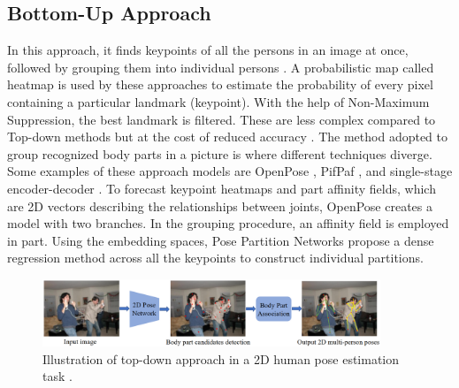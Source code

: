 \subsection{Bottom-Up Approach}
In this approach, it finds keypoints of all the persons in an image at once, followed by grouping them into individual persons \cite{bottom-up}. A probabilistic map called heatmap is used by these approaches to estimate the probability of every pixel containing a particular landmark (keypoint). With the help of Non-Maximum Suppression, the best landmark is filtered. These are less complex compared to Top-down methods but at the cost of reduced accuracy \cite{YOLO-Pose}. The method adopted to group recognized body parts in a picture is where different techniques diverge. Some examples of these approach models are OpenPose \cite{Openpose}, PifPaf \cite{PifPaf}, and single-stage encoder-decoder \cite{Nimbro}. To forecast keypoint heatmaps and part affinity fields, which are 2D vectors describing the relationships between joints, OpenPose \cite{Openpose} creates a model with two branches. In the grouping procedure, an affinity field is employed in part. Using the embedding spaces, Pose Partition Networks \cite{PosePartitionNetwork} propose a dense regression method across all the keypoints to construct individual partitions.

\begin{figure}[h!]
    \centering
    \includegraphics[width=0.9\textwidth]{bab2/ar_BottomUp.png}
    \caption{Illustration of top-down approach in a 2D human pose estimation task \cite{HPEApproaches}.}
    \label{fig:BottomUp}
\end{figure}

